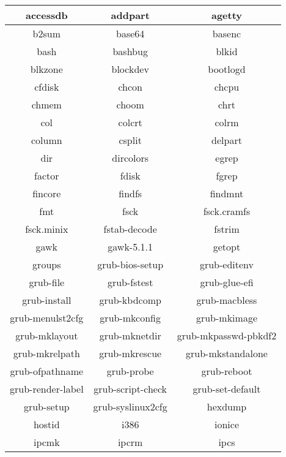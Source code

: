 \begin{center}
    \begin{tabular}{|c|c|c|}
        \hline
        accessdb & addpart & agetty \\
        \hline
        b2sum & base64 & basenc \\
        \hline
        bash & bashbug & blkid \\
        \hline
        blkzone & blockdev & bootlogd \\
        \hline
        cfdisk & chcon & chcpu \\
        \hline
        chmem & choom & chrt \\
        \hline
        col & colcrt & colrm \\
        \hline
        column & csplit & delpart \\
        \hline
        dir & dircolors & egrep \\
        \hline
        factor & fdisk & fgrep \\
        \hline
        fincore & findfs & findmnt \\
        \hline
        fmt & fsck & fsck.cramfs \\
        \hline
        fsck.minix & fstab-decode & fstrim \\
        \hline
        gawk & gawk-5.1.1 & getopt \\
        \hline
        groups & grub-bios-setup & grub-editenv \\
        \hline
        grub-file & grub-fstest & grub-glue-efi \\
        \hline
        grub-install & grub-kbdcomp & grub-macbless \\
        \hline
        grub-menulst2cfg & grub-mkconfig & grub-mkimage \\
        \hline
        grub-mklayout & grub-mknetdir & grub-mkpasswd-pbkdf2 \\
        \hline
        grub-mkrelpath & grub-mkrescue & grub-mkstandalone \\
        \hline
        grub-ofpathname & grub-probe & grub-reboot \\
        \hline
        grub-render-label & grub-script-check & grub-set-default \\
        \hline
        grub-setup & grub-syslinux2cfg & hexdump \\
        \hline
        hostid & i386 & ionice \\
        \hline
        ipcmk & ipcrm & ipcs \\
        \hline
    \end{tabular}
\end{center}

